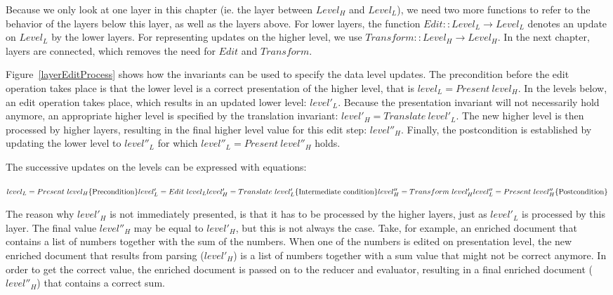 Because we only look at one layer in this chapter (ie. the layer between $Level_{H}$ and $Level_{L}$), we need two more functions to refer to the behavior of the layers below this layer, as well as the layers above. For lower layers, the function $Edit :: Level_{L} \rightarrow Level_{L}$ denotes an update on $Level_{L}$ by the lower layers. For representing updates on the higher level, we use 
$Transform :: Level_{H} \rightarrow Level_{H}$. In the next chapter, layers are connected, which removes the need for $Edit$ and $Transform$.

Figure~\ref{layerEditProcess} shows how the invariants can be used to specify the data level updates. The precondition before the edit operation takes place is that the lower level is a correct presentation of the higher level, that is $level_{L} = Present~level_{H}$. In the levels below, an edit operation takes place, which results in an updated lower level: $level'_{L}$. Because the presentation invariant will not necessarily hold anymore, an appropriate higher level is specified by the translation invariant:
$level'_{H} = Translate~level'_{L}$. The new higher level is then processed by higher layers, resulting in the final higher level value for this edit step: $level''_{H}$. Finally, the postcondition is established by updating the lower level to $level''_{L}$ for which 
$level''_{L} = Present~level''_{H}$ holds. 

The successive updates on the levels can be expressed with equations:

\begin{small}\begin{math}
level_{L} = Present~level_{H}\hfill \text{\{Precondition\}}\\
level'_{L} = Edit~level_{L}\\
level'_{H} = Translate~level'_{L}\hfill \text{\{Intermediate condition\}}\\
level''_{H} = Transform~level'_{H}\\
level''_{L} = Present~level''_{H}\hfill \text{\{Postcondition\}}\\
\end{math}\end{small}


The reason why $level'_{H}$ is not immediately presented, is that it has to be processed by the higher layers, just as $level'_{L}$ is processed by this layer. The final value $level''_{H}$ may be equal to $level'_{H}$, but this is not always the case. Take, for example, an enriched document that contains a list of numbers together with the sum of the numbers. When one of the numbers is edited on presentation level, the new enriched document that results from parsing ($level'_{H}$) is a list of numbers together with a sum value that might not be correct anymore. In order to get the correct value, the enriched document is passed on to the reducer and evaluator, resulting in a final enriched document ($level''_{H}$) that contains a correct sum.

